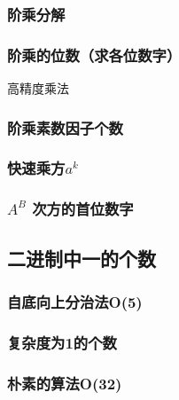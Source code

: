 \documentclass[a4paper]{article}
\begin{document}
\begin{CJK*}{UTF8}{gbsn}
\begin{multicols}{3}
\begin{flushleft}
\subsubsection{阶乘分解}



\subsubsection{阶乘的位数（求各位数字）}
高精度乘法\\


\subsubsection{阶乘素数因子个数}


\subsubsection{快速乘方\texorpdfstring{$a^k$}.}



\subsubsection{\texorpdfstring{$A^B$ }.次方的首位数字}




\subsection{二进制中一的个数}

\subsubsection{自底向上分治法O(5)}



\subsubsection{复杂度为1的个数}



\subsubsection{朴素的算法O(32)}



\end{flushleft}
\end{multicols}
\end{CJK*}
\end{document}

